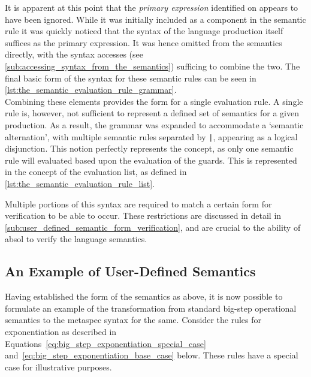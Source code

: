 It is apparent at this point that the \textit{primary expression} identified on  appears to have been ignored.
While it was initially included as a component in the semantic rule it was quickly noticed that the syntax of the language production itself suffices as the primary expression.
It was hence omitted from the semantics directly, with the syntax accesses (see \autoref{sub:accessing_syntax_from_the_semantics}) sufficing to combine the two. 
The final basic form of the syntax for these semantic rules can be seen in \autoref{lst:the_semantic_evaluation_rule_grammar}.\\

Combining these elements provides the form for a single evaluation rule.
A single rule is, however, not sufficient to represent a defined set of semantics for a given production. 
As a result, the grammar was expanded to accommodate a `semantic alternation', with multiple semantic rules separated by \texttt{|}, appearing as a logical disjunction.
This notion perfectly represents the concept, as only one semantic rule will evaluated based upon the evaluation of the guards. 
This is represented in the concept of the evaluation list, as defined in \autoref{lst:the_semantic_evaluation_rule_list}.


Multiple portions of this syntax are required to match a certain form for verification to be able to occur. 
These restrictions are discussed in detail in \autoref{sub:user_defined_semantic_form_verification}, and are crucial to the ability of \gls{absol} to verify the language semantics.


\subsection{An Example of User-Defined Semantics} %
\label{sub:an_example_of_user_defined_semantics}
Having established the form of the semantics as above, it is now possible to formulate an example of the transformation from standard big-step operational semantics to the \gls{metaspec} syntax for the same.
Consider the rules for exponentiation as described in Equations~\ref{eq:big_step_exponentiation_special_case} and~\ref{eq:big_step_exponentiation_base_case} below.
These rules have a special case for illustrative purposes. 

